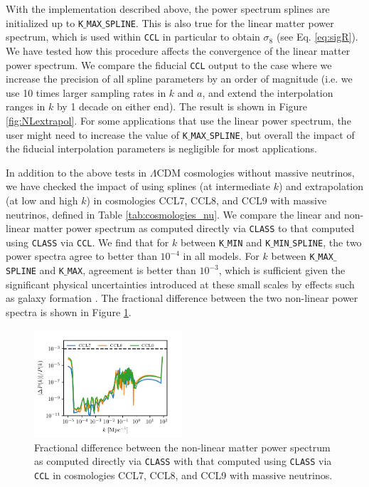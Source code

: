 \documentclass[\docopts]{\docclass}
\newcommand{\ccl}{{\tt CCL}\xspace}
\newcommand{\class}{{\tt CLASS}\xspace}
\begin{document}
With the implementation described above, the power spectrum splines are initialized up to {\tt K$\_$MAX$\_$SPLINE}. This is also true for the linear matter power spectrum, which is used within \ccl in particular to obtain $\sigma_8$ (see Eq. \ref{eq:sigR}). We have tested how this procedure affects the convergence of the linear matter power spectrum. We compare the fiducial \ccl output to the case where we increase the precision of all spline parameters by an order of magnitude (i.e. we use 10 times larger sampling rates in $k$ and $a$, and extend the interpolation ranges in $k$ by 1 decade on either end). The result is shown in Figure \ref{fig:NLextrapol}. For some applications that use the linear power spectrum, the user might need to increase the value of {\tt K$\_$MAX$\_$SPLINE}, but overall the impact of the fiducial interpolation parameters is negligible for most applications.

In addition to the above tests in $\Lambda$CDM cosmologies without massive neutrinos, we have checked the impact of using splines (at intermediate $k$) and extrapolation (at low and high $k$) in cosmologies CCL7, CCL8, and CCL9 with massive neutrinos, defined in Table \ref{tab:cosmologies_nu}. We compare the linear and non-linear matter power spectrum as computed directly via \class to that computed using \class via \ccl . We find that for $k$  between {\tt K$\_$MIN} and {\tt K$\_$MIN$\_$SPLINE}, the two power spectra agree to better than $10^{-4}$ in all models. For $k$ between {\tt K$\_$MAX$\_$SPLINE} and {\tt K$\_$MAX}, agreement is better than $10^{-3}$, which is sufficient given the significant physical uncertainties introduced at these small scales by effects such as galaxy formation \citep{vanDaalen11}. The fractional difference between the two non-linear power spectra is shown in Figure \ref{fig:power_nu}. 

\begin{figure}
\centering
\includegraphics[width=0.49\textwidth]{pk_class_nu_NL}
\caption{Fractional difference between the non-linear matter power spectrum as computed directly via \class with that computed using \class via \ccl in cosmologies CCL7, CCL8, and CCL9 with massive neutrinos.}
\label{fig:power_nu}
\end{figure}
\end{document}
